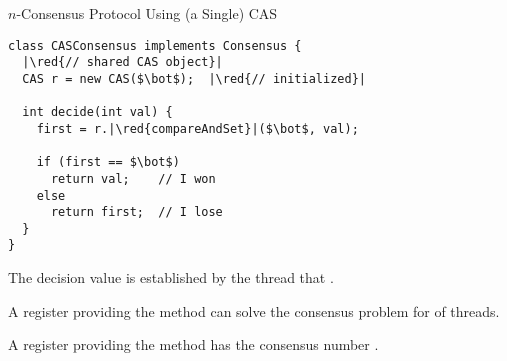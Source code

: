 \begin{frame}{}
\end{frame}

\begin{frame}{}
  \centerline{\LARGE $n$-Consensus Protocol Using {\normalsize (a Single)} \textsf{CAS}}

\end{frame}

\begin{frame}[fragile]{}
  \begin{lstlisting}[style = CStyle]
class CASConsensus implements Consensus {
  |\red{// shared CAS object}|
  CAS r = new CAS($\bot$);  |\red{// initialized}|

  int decide(int val) {
    first = r.|\red{compareAndSet}|($\bot$, val);

    if (first == $\bot$)
      return val;    // I won
    else
      return first;  // I lose
  }
}
  \end{lstlisting}

  \pause
  \vspace{0.50cm}
  \centerline{The decision value is established by the thread that .}
\end{frame}
% 
\begin{frame}{}
  \begin{theorem}
    A  register providing the  method
    can solve the consensus problem for  of threads.
  \end{theorem}

  \pause
  \vspace{0.60cm}
  \begin{theorem}
    A  register providing the  method
    has the consensus number \blue{$\infty$}.
  \end{theorem}
\end{frame}
